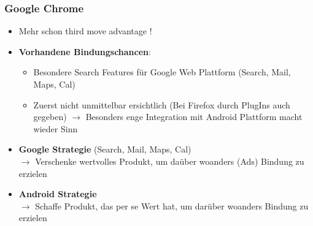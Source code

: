 \documentclass{article} %
\begin{document}
		\subsubsection{Google Chrome}
		\begin{itemize}
			\item Mehr schon third move advantage !
			\item \textbf{Vorhandene Bindungschancen}:
			\begin{itemize}
				\item Besondere Search Features für Google Web Plattform (Search, Mail, Maps, Cal)
				\item Zuerst nicht unmittelbar ersichtlich (Bei Firefox durch PlugIns auch gegeben) $\rightarrow$ Besonders enge Integration mit Android Plattform macht wieder Sinn
			\end{itemize}
			\item \textbf{Google Strategie} (Search, Mail, Maps, Cal)\\
				$\rightarrow$ Verschenke wertvolles Produkt, um daüber woanders (Ads) Bindung zu erzielen
				\item \textbf{Android Strategie}\\
				$\rightarrow$ Schaffe Produkt, das per se Wert hat, um darüber woanders Bindung zu erzielen
		\end{itemize}
		
		
\end{document}
